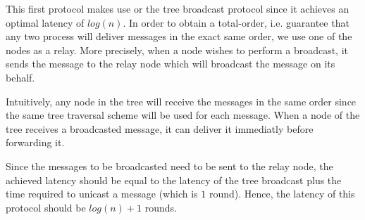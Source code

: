 \documentclass[a4paper]{article}
\begin{document}
        This first protocol makes use or the tree broadcast protocol since it achieves
        an optimal latency of $log(n)$. In order to obtain a total-order, i.e.
        guarantee that any two process will deliver messages in the exact same order,
        we use one of the nodes as a relay. More precisely, when a node wishes to
        perform a broadcast, it sends the message to the relay node which will
        broadcast the message on its behalf.

        Intuitively, any node in the tree will receive the messages in the same order
        since the same tree traversal scheme will be used for each message. When a
        node of the tree receives a broadcasted message, it can deliver it immediatly
        before forwarding it.

	Since the messages to be broadcasted need to be sent to the relay node, the
        achieved latency should be equal to the latency of the tree broadcast plus
        the time required to unicast a message (which is $1$ round). Hence, the
        latency of this protocol should be $log(n) + 1$ rounds.
\end{document}
